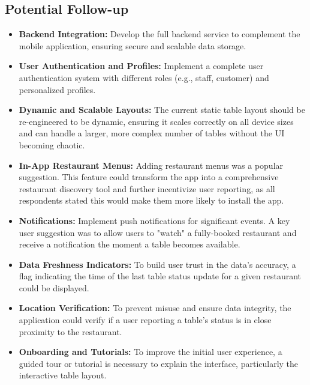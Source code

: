\documentclass{article}
\begin{document}
\subsection{Potential Follow-up}
\begin{itemize}
    \item \textbf{Backend Integration:} Develop the full backend service to complement the mobile application, ensuring secure and scalable data storage.

    \item \textbf{User Authentication and Profiles:} Implement a complete user authentication system with different roles (e.g., staff, customer) and personalized profiles.
    
    \item \textbf{Dynamic and Scalable Layouts:} The current static table layout should be re-engineered to be dynamic, ensuring it scales correctly on all device sizes and can handle a larger, more complex number of tables without the UI becoming chaotic.

    \item \textbf{In-App Restaurant Menus:} Adding restaurant menus was a popular suggestion. This feature could transform the app into a comprehensive restaurant discovery tool and further incentivize user reporting, as all respondents stated this would make them more likely to install the app.

    \item \textbf{Notifications:} Implement push notifications for significant events. A key user suggestion was to allow users to "watch" a fully-booked restaurant and receive a notification the moment a table becomes available.

    \item \textbf{Data Freshness Indicators:} To build user trust in the data's accuracy, a flag indicating the time of the last table status update for a given restaurant could be displayed.

    \item \textbf{Location Verification:} To prevent misuse and ensure data integrity, the application could verify if a user reporting a table's status is in close proximity to the restaurant.

    \item \textbf{Onboarding and Tutorials:} To improve the initial user experience, a guided tour or tutorial is necessary to explain the interface, particularly the interactive table layout.
\end{itemize}
\end{document}
